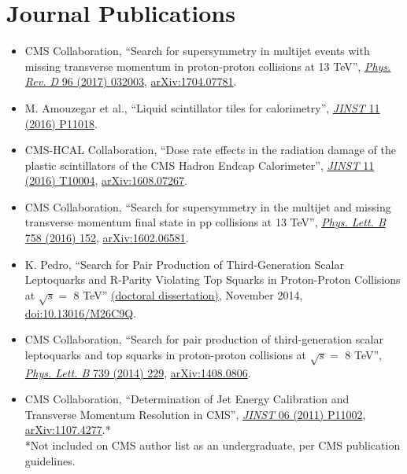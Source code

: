 \section{Journal Publications}
\begin{itemize}[leftmargin=12pt]
\item CMS Collaboration, ``Search for supersymmetry in multijet events with missing transverse momentum in proton-proton collisions at 13 TeV'', \href{http://dx.doi.org/10.1103/PhysRevD.96.032003}{\emph{Phys. Rev. D} 96 (2017) 032003}, \href{http://arxiv.org/abs/1704.07781}{arXiv:1704.07781}.
\item M. Amouzegar et al., ``Liquid scintillator tiles for calorimetry'', \href{http://dx.doi.org/10.1088/1748-0221/11/11/P11018}{\emph{JINST} 11 (2016) P11018}.
\item CMS-HCAL Collaboration, ``Dose rate effects in the radiation damage of the plastic scintillators of the CMS Hadron Endcap Calorimeter'', \href{http://dx.doi.org/10.1088/1748-0221/11/10/T10004}{\emph{JINST} 11 (2016) T10004}, \href{http://arxiv.org/abs/1608.07267}{arXiv:1608.07267}.
\item CMS Collaboration, ``Search for supersymmetry in the multijet and missing transverse momentum final state in pp collisions at 13 TeV'', \href{http://dx.doi.org/10.1016/j.physletb.2016.05.002}{\emph{Phys. Lett. B} 758 (2016) 152}, \href{http://arxiv.org/abs/1602.06581}{arXiv:1602.06581}.
\ifdefined\longflag
\item K. Pedro, ``Search for Pair Production of Third-Generation Scalar Leptoquarks and R-Parity Violating Top Squarks in Proton-Proton Collisions at $\sqrt{s} =$ 8 TeV'' \href{http://cds.cern.ch/record/1968611}{(doctoral dissertation)}, November 2014, \href{https://doi.org/10.13016/M26C9Q}{doi:10.13016/M26C9Q}.
\fi
\item CMS Collaboration, ``Search for pair production of third-generation scalar leptoquarks and top squarks in proton-proton collisions at $\sqrt{s} =$ 8 TeV'', \href{http://dx.doi.org/10.1016/j.physletb.2014.10.063}{\emph{Phys. Lett. B} 739 (2014) 229}, \href{http://arxiv.org/abs/1408.0806}{arXiv:1408.0806}.
\ifdefined\longerflag
\item CMS Collaboration, ``Determination of Jet Energy Calibration and Transverse Momentum Resolution in CMS'', \href{http://dx.doi.org/10.1088/1748-0221/6/11/P11002}{\emph{JINST} 06 (2011) P11002}, \href{http://arxiv.org/abs/1107.4277}{arXiv:1107.4277}.*\\
\small{*Not included on CMS author list as an undergraduate, per CMS publication guidelines.}
\fi
\end{itemize}

